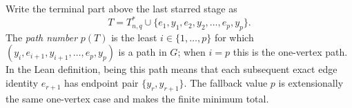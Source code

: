 \begin{definition}
Write the terminal part above the last starred stage as
\[
 T=T_{n,q}^{*}\cup\{e_1,y_1,e_2,y_2,\ldots,e_p,y_p\}.
\]
The \emph{path number} $p(T)$ is the least
$i\in\{1,\ldots,p\}$ for which
$(y_i,e_{i+1},y_{i+1},\ldots,e_p,y_p)$ is a path in $G$; when $i=p$
this is the one-vertex path.  In the Lean definition, being this path
means that each subsequent exact edge identity $e_{r+1}$ has endpoint
pair $\{y_r,y_{r+1}\}$.  The fallback value $p$ is extensionally the
same one-vertex case and makes the finite minimum total.
\end{definition}
